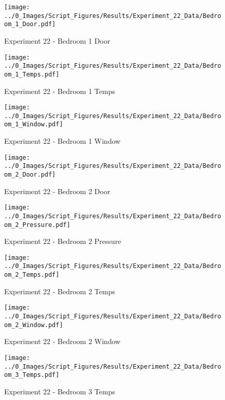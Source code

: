 	\begin{figure}[H]
		\centering
		\texttt{[image: ../0\_Images/Script\_Figures/Results/Experiment\_22\_Data/Bedroom\_1\_Door.pdf]}
		\caption[]{Experiment 22 - Bedroom 1 Door}
	\end{figure}
 

	\begin{figure}[H]
		\centering
		\texttt{[image: ../0\_Images/Script\_Figures/Results/Experiment\_22\_Data/Bedroom\_1\_Temps.pdf]}
		\caption[]{Experiment 22 - Bedroom 1 Temps}
	\end{figure}
 
	\clearpage

	\begin{figure}[H]
		\centering
		\texttt{[image: ../0\_Images/Script\_Figures/Results/Experiment\_22\_Data/Bedroom\_1\_Window.pdf]}
		\caption[]{Experiment 22 - Bedroom 1 Window}
	\end{figure}
 

	\begin{figure}[H]
		\centering
		\texttt{[image: ../0\_Images/Script\_Figures/Results/Experiment\_22\_Data/Bedroom\_2\_Door.pdf]}
		\caption[]{Experiment 22 - Bedroom 2 Door}
	\end{figure}
 
	\clearpage

	\begin{figure}[H]
		\centering
		\texttt{[image: ../0\_Images/Script\_Figures/Results/Experiment\_22\_Data/Bedroom\_2\_Pressure.pdf]}
		\caption[]{Experiment 22 - Bedroom 2 Pressure}
	\end{figure}
 

	\begin{figure}[H]
		\centering
		\texttt{[image: ../0\_Images/Script\_Figures/Results/Experiment\_22\_Data/Bedroom\_2\_Temps.pdf]}
		\caption[]{Experiment 22 - Bedroom 2 Temps}
	\end{figure}
 
	\clearpage

	\begin{figure}[H]
		\centering
		\texttt{[image: ../0\_Images/Script\_Figures/Results/Experiment\_22\_Data/Bedroom\_2\_Window.pdf]}
		\caption[]{Experiment 22 - Bedroom 2 Window}
	\end{figure}
 

	\begin{figure}[H]
		\centering
		\texttt{[image: ../0\_Images/Script\_Figures/Results/Experiment\_22\_Data/Bedroom\_3\_Temps.pdf]}
		\caption[]{Experiment 22 - Bedroom 3 Temps}
	\end{figure}
 
